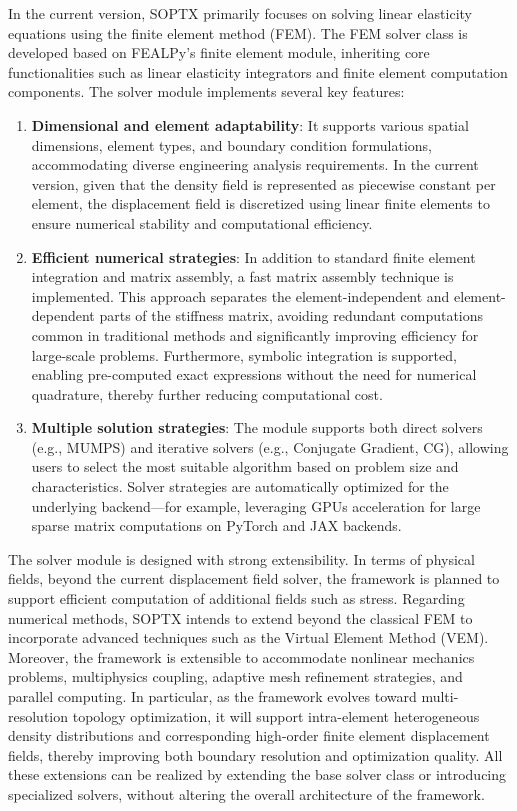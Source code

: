 \documentclass[mathpazo]{cicp}
\begin{document}
In the current version, SOPTX primarily focuses on solving linear elasticity equations using the finite element method (FEM). The FEM solver class is developed based on FEALPy's finite element module, inheriting core functionalities such as linear elasticity integrators and finite element computation components. The solver module implements several key features:
\begin{enumerate}
	\item \textbf{Dimensional and element adaptability}: It supports various spatial dimensions, element types, and boundary condition formulations, accommodating diverse engineering analysis requirements. In the current version, given that the density field is represented as piecewise constant per element, the displacement field is discretized using linear finite elements to ensure numerical stability and computational efficiency.
	\item \textbf{Efficient numerical strategies}: In addition to standard finite element integration and matrix assembly, a fast matrix assembly technique is implemented. This approach separates the element-independent and element-dependent parts of the stiffness matrix, avoiding redundant computations common in traditional methods and significantly improving efficiency for large-scale problems. Furthermore, symbolic integration is supported, enabling pre-computed exact expressions without the need for numerical quadrature, thereby further reducing computational cost.
	\item \textbf{Multiple solution strategies}: The module supports both direct solvers (e.g., MUMPS) and iterative solvers (e.g., Conjugate Gradient, CG), allowing users to select the most suitable algorithm based on problem size and characteristics. Solver strategies are automatically optimized for the underlying backend—for example, leveraging GPUs acceleration for large sparse matrix computations on PyTorch and JAX backends. 
\end{enumerate}

The solver module is designed with strong extensibility. In terms of physical fields, beyond the current displacement field solver, the framework is planned to support efficient computation of additional fields such as stress. Regarding numerical methods, SOPTX intends to extend beyond the classical FEM to incorporate advanced techniques such as the Virtual Element Method (VEM). Moreover, the framework is extensible to accommodate nonlinear mechanics problems, multiphysics coupling, adaptive mesh refinement strategies, and parallel computing. In particular, as the framework evolves toward multi-resolution topology optimization, it will support intra-element heterogeneous density distributions and corresponding high-order finite element displacement fields, thereby improving both boundary resolution and optimization quality. All these extensions can be realized by extending the base solver class or introducing specialized solvers, without altering the overall architecture of the framework.
\end{document}
